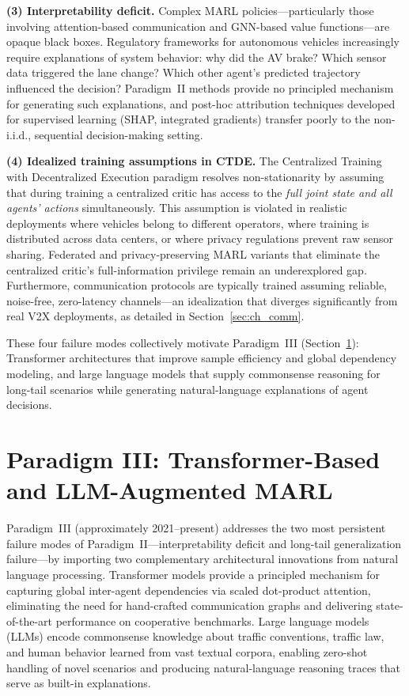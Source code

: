\documentclass[12pt, a4paper]{article}
\begin{document}
\textbf{(3) Interpretability deficit.}
Complex MARL policies---particularly those involving attention-based communication
and GNN-based value functions---are opaque black boxes.  Regulatory frameworks
for autonomous vehicles increasingly require explanations of system behavior:
why did the AV brake?  Which sensor data triggered the lane change?  Which
other agent's predicted trajectory influenced the decision?  Paradigm~II
methods provide no principled mechanism for generating such explanations, and
post-hoc attribution techniques developed for supervised learning (SHAP,
integrated gradients) transfer poorly to the non-i.i.d., sequential
decision-making setting.

\textbf{(4) Idealized training assumptions in CTDE.}
The Centralized Training with Decentralized Execution paradigm resolves
non-stationarity by assuming that during training a centralized
critic has access to the \emph{full joint state and all agents' actions}
simultaneously.  This assumption is violated in realistic deployments
where vehicles belong to different operators, where training is distributed
across data centers, or where privacy regulations prevent raw sensor
sharing.  Federated and privacy-preserving MARL variants that eliminate the
centralized critic's full-information privilege remain an underexplored gap.
Furthermore, communication protocols are typically trained assuming reliable,
noise-free, zero-latency channels---an idealization that diverges significantly
from real V2X deployments, as detailed in Section~\ref{sec:ch_comm}.

These four failure modes collectively motivate Paradigm~III
(Section~\ref{sec:paradigm3}):
Transformer architectures that improve sample efficiency and global dependency
modeling, and large language models that supply commonsense reasoning for
long-tail scenarios while generating natural-language explanations of agent
decisions.

\section{Paradigm III: Transformer-Based and LLM-Augmented MARL}
\label{sec:paradigm3}

Paradigm~III (approximately 2021--present) addresses the two most persistent
failure modes of Paradigm~II---interpretability deficit and long-tail
generalization failure---by importing two complementary architectural
innovations from natural language processing.  Transformer models provide a
principled mechanism for capturing global inter-agent dependencies via
scaled dot-product attention, eliminating the need for hand-crafted
communication graphs and delivering state-of-the-art performance on cooperative
benchmarks.  Large language models (LLMs) encode commonsense knowledge about
traffic conventions, traffic law, and human behavior learned from vast textual
corpora, enabling zero-shot handling of novel scenarios and producing
natural-language reasoning traces that serve as built-in explanations.
\end{document}
